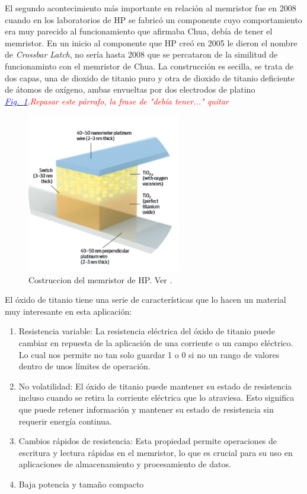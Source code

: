 \documentclass[12pt,a4paper]{report} %
\newcommand{\fref}[1]{\hyperref[#1]{\textcolor{blue}{\textit{Fig.~\ref*{#1}}}}}
\begin{document}
	
	
	\newpage
	
	\noindent El segundo acontecimiento más importante en relación al memristor fue en 2008 cuando en los laboratorios de HP se fabricó un componente cuyo comportamiento era muy parecido al funcionamiento que afirmaba Chua, debía de tener el memristor. En un inicio al componente que HP creó en 2005 le dieron el nombre de \textit{Crossbar Latch}, no sería hasta 2008 que se percataron de la similitud de funcionaminto con el memristor de Chua. La construcción es secilla, se trata de dos capas, una de dioxido de titanio puro y otra de dioxido de titanio deficiente de átomos de oxígeno, ambas envueltas por dos electrodos de platino \fref{fig:mem1}.\textit{\textcolor{red}{Repasar este párrafo, la frase de "debía tener..." quitar}}
	
	\begin{figure}[h]
		\centering
		\includegraphics[width=0.6\textwidth]{mem1.png}
		\caption{Costruccion del memristor de HP. Ver \cite{williams}.}
		\label{fig:mem1}
	\end{figure}
	
	El óxido de titanio tiene una serie de características que lo hacen un material muy interesante en esta aplicación:
	\begin{enumerate}
		\item Resistencia variable: La resistencia eléctrica del óxido de titanio puede cambiar en repuesta de la aplicación de una corriente o un campo eléctrico. Lo cual nos permite no tan solo guardar 1 o 0 si no un rango de valores dentro de unos límites de operación.
		\item No volatilidad: El óxido de titanio puede mantener su estado de resistencia incluso cuando se retira la corriente eléctrica que lo atraviesa. Esto significa que puede retener información y mantener su estado de resistencia sin requerir energía continua.
		\item Cambios rápidos de resistencia:  Esta propiedad permite operaciones de escritura y lectura rápidas en el memristor, lo que es crucial para su uso en aplicaciones de almacenamiento y procesamiento de datos.
		\item Baja potencia y tamaño compacto
	\end{enumerate}
	\newpage
	
\end{document}
